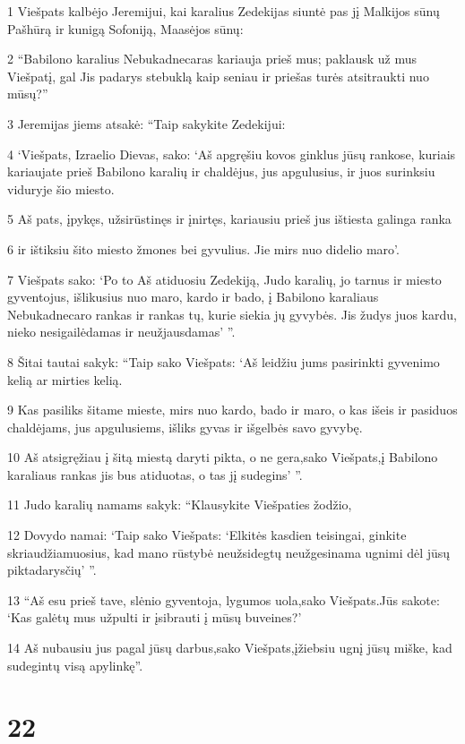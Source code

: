 \par 1 Viešpats kalbėjo Jeremijui, kai karalius Zedekijas siuntė pas jį Malkijos sūnų Pašhūrą ir kunigą Sofoniją, Maasėjos sūnų: 
\par 2 “Babilono karalius Nebukadnecaras kariauja prieš mus; paklausk už mus Viešpatį, gal Jis padarys stebuklą kaip seniau ir priešas turės atsitraukti nuo mūsų?” 
\par 3 Jeremijas jiems atsakė: “Taip sakykite Zedekijui: 
\par 4 ‘Viešpats, Izraelio Dievas, sako: ‘Aš apgręšiu kovos ginklus jūsų rankose, kuriais kariaujate prieš Babilono karalių ir chaldėjus, jus apgulusius, ir juos surinksiu viduryje šio miesto. 
\par 5 Aš pats, įpykęs, užsirūstinęs ir įnirtęs, kariausiu prieš jus ištiesta galinga ranka 
\par 6 ir ištiksiu šito miesto žmones bei gyvulius. Jie mirs nuo didelio maro’. 
\par 7 Viešpats sako: ‘Po to Aš atiduosiu Zedekiją, Judo karalių, jo tarnus ir miesto gyventojus, išlikusius nuo maro, kardo ir bado, į Babilono karaliaus Nebukadnecaro rankas ir rankas tų, kurie siekia jų gyvybės. Jis žudys juos kardu, nieko nesigailėdamas ir neužjausdamas’ ”. 
\par 8 Šitai tautai sakyk: “Taip sako Viešpats: ‘Aš leidžiu jums pasirinkti gyvenimo kelią ar mirties kelią. 
\par 9 Kas pasiliks šitame mieste, mirs nuo kardo, bado ir maro, o kas išeis ir pasiduos chaldėjams, jus apgulusiems, išliks gyvas ir išgelbės savo gyvybę. 
\par 10 Aš atsigręžiau į šitą miestą daryti pikta, o ne gera,­sako Viešpats,­į Babilono karaliaus rankas jis bus atiduotas, o tas jį sudegins’ ”. 
\par 11 Judo karalių namams sakyk: “Klausykite Viešpaties žodžio, 
\par 12 Dovydo namai: ‘Taip sako Viešpats: ‘Elkitės kasdien teisingai, ginkite skriaudžiamuosius, kad mano rūstybė neužsidegtų neužgesinama ugnimi dėl jūsų piktadarysčių’ ”. 
\par 13 “Aš esu prieš tave, slėnio gyventoja, lygumos uola,­sako Viešpats.­Jūs sakote: ‘Kas galėtų mus užpulti ir įsibrauti į mūsų buveines?’ 
\par 14 Aš nubausiu jus pagal jūsų darbus,­sako Viešpats,­įžiebsiu ugnį jūsų miške, kad sudegintų visą apylinkę”.



\chapter{22}



